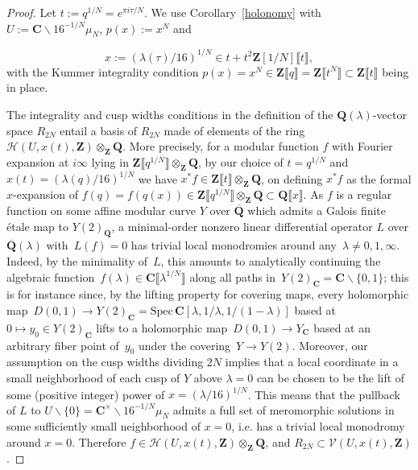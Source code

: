\documentclass[10pt]{amsart}
\renewcommand\setminus{\smallsetminus}
\def\spec{\mathrm{Spec} \,}
\def\Z{\mathbf{Z}}
\def\Q{\mathbf{Q}}
\theoremstyle{remark}
\numberwithin{equation}{subsection}
\def\numequation{\addtocounter{subsubsection}{1}\begin{equation}}
\def\C{\mathbf{C}}
\begin{document}
\begin{proof}
Let $t := q^{1/N} = e^{\pi i \tau / N}$.
We use Corollary~\ref{holonomy} with $U := \C \setminus 16^{-1/N}\mu_N$, $p(x) := x^N$ and
\numequation \label{coordinate}
x := (\lambda(\tau)/16)^{1/N} \in t + t^2 \Z[1/N]\llbracket t \rrbracket,
\end{equation}
with the Kummer integrality condition $p(x) = x^N \in \Z\llbracket q \rrbracket = \Z\llbracket t^N \rrbracket \subset \Z\llbracket t \rrbracket$ being in place. 

The integrality and cusp widths conditions in the definition of the $\Q(\lambda)$-vector space $R_{2N}$ entail  a basis of $R_{2N}$ made of elements of the ring $\mathcal{H}(U,x(t),\Z)\otimes_{\Z}\Q$. More precisely, for a modular function $f$ with Fourier expansion at $i\infty$ lying in $\Z\llbracket q^{1/N}\rrbracket \otimes_{\Z}\Q$, by our choice of $t = q^{1/N}$ and $x(t) = (\lambda(q)/16)^{1/N}$ we have  $x^* f \in \Z\llbracket t\rrbracket \otimes_{\Z} \Q$, on defining $x^*f$ as the formal $x$-expansion of $f(q) = f(q(x)) \in \Z \llbracket q^{1/N} \rrbracket \otimes_{\Z} \Q \subset  \Q \llbracket x \rrbracket$. As $f$ is a regular function on some affine modular curve $Y$ over $\overline{\Q}$ which admits a Galois finite \'etale map to $Y(2)_{\overline{\Q}}$, a minimal-order nonzero linear differential operator $L$ over $\overline{\Q}(\lambda)$ with~$L(f)= 0$ has trivial local monodromies around any~$\lambda \neq 0, 1, \infty$. Indeed, by the minimality of~$L$, this amounts to analytically continuing the algebraic function~$f(\lambda) \in \C\llbracket \lambda^{1/N}\rrbracket$ along all paths in~$Y(2)_{\C} = \C \setminus \{0,1\}$; this is for instance since, by the lifting property for covering maps, every holomorphic map~$D(0,1) \to Y(2)_{\C} = \spec \C[\lambda,1/\lambda, 1/(1-\lambda)]$ based at~$0 \mapsto y_0 \in Y(2)_{\C}$ lifts to a holomorphic map~$D(0,1) \to Y_{\C}$ based at an arbitrary fiber point of~$y_0$ under the covering~$Y \to Y(2)$.  %
Moreover, our assumption on the cusp widths dividing $2N$ implies that a local coordinate in a small neighborhood of each cusp of $Y$ above $\lambda=0$ can be chosen to be the lift of some (positive integer) power of $x=(\lambda/16)^{1/N}$. This means that the pullback of $L$ to $U\setminus\{0\} = \C^{\times} \setminus 16^{-1/N} \mu_N$  admits a full set of meromorphic solutions in some sufficiently small neighborhood of $x=0$, i.e. has a trivial local monodromy around $x = 0$.  Therefore $f\in \mathcal{H}(U,x(t),\Z)\otimes_{\Z}\Q$, and $R_{2N}\subset \mathcal{V}(U,x(t),\Z)$. 


\end{proof}
\end{document}
